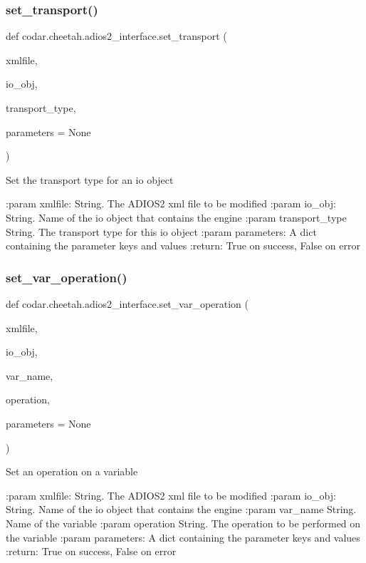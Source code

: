\subsubsection{\texorpdfstring{set\+\_\+transport()}{set\_transport()}}
{\footnotesize\ttfamily def codar.\+cheetah.\+adios2\+\_\+interface.\+set\+\_\+transport (\begin{DoxyParamCaption}\item[{}]{xmlfile,  }\item[{}]{io\+\_\+obj,  }\item[{}]{transport\+\_\+type,  }\item[{}]{parameters = {\ttfamily None} }\end{DoxyParamCaption})}

\begin{DoxyVerb}Set the transport type for an io object

:param xmlfile: String. The ADIOS2 xml file to be modified
:param io_obj: String. Name of the io object that contains the engine
:param transport_type String. The transport type for this io object
:param parameters: A dict containing the parameter keys and values
:return: True on success, False on error
\end{DoxyVerb}
 \mbox{\label{namespacecodar_1_1cheetah_1_1adios2__interface_a7bfeac0db728f4fcfd42c176d18e1a20}} 
\subsubsection{\texorpdfstring{set\+\_\+var\+\_\+operation()}{set\_var\_operation()}}
{\footnotesize\ttfamily def codar.\+cheetah.\+adios2\+\_\+interface.\+set\+\_\+var\+\_\+operation (\begin{DoxyParamCaption}\item[{}]{xmlfile,  }\item[{}]{io\+\_\+obj,  }\item[{}]{var\+\_\+name,  }\item[{}]{operation,  }\item[{}]{parameters = {\ttfamily None} }\end{DoxyParamCaption})}

\begin{DoxyVerb}Set an operation on a variable

:param xmlfile: String. The ADIOS2 xml file to be modified
:param io_obj: String. Name of the io object that contains the engine
:param var_name String. Name of the variable
:param operation String. The operation to be performed on the variable
:param parameters: A dict containing the parameter keys and values
:return: True on success, False on error
\end{DoxyVerb}
 